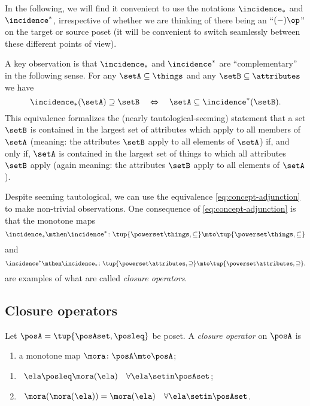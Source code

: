 In the following, we will find it convenient to use the notations $\incidence_*$ and $\incidence^*$, irrespective of whether we are thinking of there being an ``$( - )\op $'' on the target or source poset (it will be convenient to switch seamlessly between these different points of view). 

A key observation is that $\incidence_*$ and $\incidence^*$ are ``complementary'' in the following sense. For any $\setA \subseteq \things$ and any $\setB \subseteq \attributes$ we have 
\begin{equation}\label{eq:concept-adjunction}
\incidence_*(\setA) \supseteq \setB \quad \Leftrightarrow \quad \setA \subseteq \incidence^*(\setB).
\end{equation}
This equivalence formalizes the (nearly tautological-seeming) statement that a set $\setB$ is contained in the largest set of attributes which apply to all members of $\setA$ (meaning: the attributes $\setB$ apply to all elements of $\setA$) if, and only if, $\setA$ is contained in the largest set of things to which all attributes $\setB$ apply (again meaning: the attributes $\setB$ apply to all elements of $\setA$). 

Despite seeming tautological, we can use the equivalence \cref{eq:concept-adjunction} to make non-trivial observations. One consequence of \cref{eq:concept-adjunction} is that the monotone maps 
\begin{equation}\label{eq:fca-closure-operator-things}
\incidence_* \mthen \incidence^* \colon \tup{\powerset \things, \subseteq} \mto \tup{\powerset \things, \subseteq}
\end{equation}
and 
\begin{equation}\label{eq:fca-closure-operator-attributes}
\incidence^* \mthen \incidence_* \colon \tup{\powerset \attributes, \supseteq} \mto \tup{\powerset \attributes, \supseteq}.
\end{equation}
are examples of what are called \emph{closure operators}.


\subsection{Closure operators}

\begin{definition}\label{def:closure-operator}
Let $\posA = \tup{\posAset, \posleq}$ be poset. A \emph{closure operator} on $\posA$ is

\constit
\begin{enumerate}
\item a monotone map $\mora \colon \posA \mto \posA$; 
\end{enumerate}

\condit
\begin{enumerate}
\item {} \  $\ela \posleq \mora(\ela) \quad \forall \ela \setin \posAset$;
\item {} \ $\mora (\mora(\ela)) =  \mora(\ela) \quad \forall \ela \setin \posAset$. 
\end{enumerate}



\end{definition}

